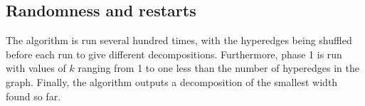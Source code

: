 \documentclass[a4paper,UKenglish,cleveref, autoref]{lipics-v2019}
\begin{document}
{%

\subsection{Randomness and restarts}

The algorithm is run several hundred times, with the hyperedges being shuffled before each run to give different decompositions.  Furthermore, phase 1 is run with values of $k$ ranging from 1 to one less than the number of hyperedges in the graph.  Finally, the algorithm outputs a decomposition of the smallest width found so far.
}
\end{document}
